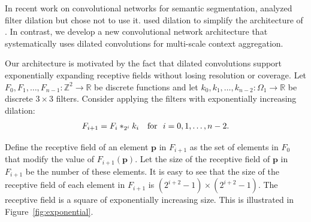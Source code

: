 \documentclass{article} %
\def\pp{\mathbf p}
\def\Re{\mathbb{R}}
\def\Ze{\mathbb{Z}}
\newcommand{\timess}{\mathbin{\!\times\!}}
\begin{document}
In recent work on convolutional networks for semantic segmentation, \cite{Long2015} analyzed filter dilation but chose not to use it. \cite{Chen2015ICLR} used dilation to simplify the architecture of \cite{Long2015}.
In contrast, we develop a new convolutional network architecture that systematically uses dilated convolutions for multi-scale context aggregation.

Our architecture is motivated by the fact that dilated convolutions support exponentially expanding receptive fields without losing resolution or coverage. Let $F_0, F_1, \ldots , F_{n-1}: \Ze^2 \rightarrow \Re$ be discrete functions and let \mbox{$k_0, k_1, \ldots , k_{n-2}: \Omega_1 \rightarrow \Re$} be discrete $3\timess 3$ filters. Consider applying the filters with exponentially increasing dilation:
\begin{eqnarray}
F_{i+1} = F_{i} \ast_{2^{i}} k_{i} \quad \textup{for\ \ } i = 0, 1, \ldots, n-2.
\label{eq:exponential}
\end{eqnarray}

Define the receptive field of an element $\pp$ in $F_{i+1}$ as the set of elements in $F_0$ that modify the value of $F_{i+1}(\pp)$. Let the size of the receptive field of $\pp$ in $F_{i+1}$ be the number of these elements. It is easy to see that the size of the receptive field of each element in $F_{i+1}$ is \mbox{$(2^{i+2} - 1)\timess(2^{i+2} - 1)$}. The receptive field is a square of exponentially increasing size. This is illustrated in Figure~\ref{fig:exponential}.
\end{document}
